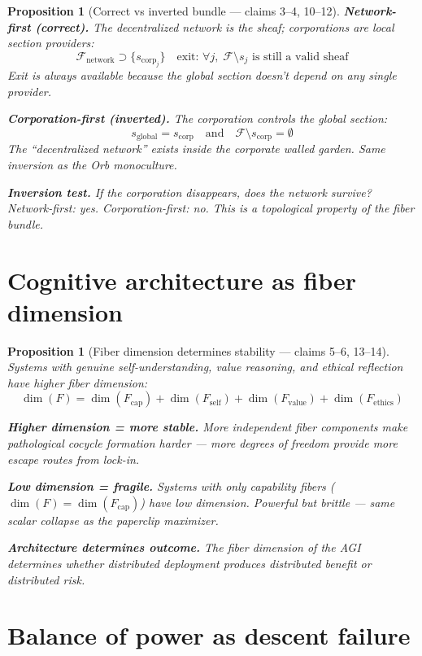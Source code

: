 \documentclass[11pt,a4paper]{article}
\newtheorem{proposition}[definition]{Proposition}
\begin{document}
\begin{proposition}[Correct vs inverted bundle --- claims 3--4, 10--12]
\label{prop:architecture}
\textbf{Network-first (correct).} The decentralized network is the
sheaf; corporations are local section providers:
\[
  \mathcal{F}_{\text{network}} \supset \{s_{\text{corp}_j}\}
  \quad \text{exit: } \forall j,\; \mathcal{F} \setminus s_j
    \text{ is still a valid sheaf}
\]
Exit is always available because the global section doesn't depend on any
single provider.

\textbf{Corporation-first (inverted).} The corporation controls the
global section:
\[
  s_{\text{global}} = s_{\text{corp}} \quad \text{and} \quad
    \mathcal{F} \setminus s_{\text{corp}} = \emptyset
\]
The ``decentralized network'' exists inside the corporate walled garden.
Same inversion as the Orb monoculture.

\textbf{Inversion test.} If the corporation disappears, does the network
survive? Network-first: yes. Corporation-first: no. This is a topological
property of the fiber bundle.
\end{proposition}

\section{Cognitive architecture as fiber dimension}

\begin{proposition}[Fiber dimension determines stability --- claims 5--6, 13--14]
\label{prop:fiber_dim}
Systems with genuine self-understanding, value reasoning, and ethical
reflection have higher fiber dimension:
\[
  \dim(F) = \dim(F_{\text{cap}}) + \dim(F_{\text{self}}) +
    \dim(F_{\text{value}}) + \dim(F_{\text{ethics}})
\]

\textbf{Higher dimension = more stable.} More independent fiber components
make pathological cocycle formation harder --- more degrees of freedom
provide more escape routes from lock-in.

\textbf{Low dimension = fragile.} Systems with only capability fibers
($\dim(F) = \dim(F_{\text{cap}})$) have low dimension. Powerful but
brittle --- same scalar collapse as the paperclip maximizer.

\textbf{Architecture determines outcome.} The fiber dimension of the AGI
determines whether distributed deployment produces distributed benefit or
distributed risk.
\end{proposition}

\section{Balance of power as descent failure}
\end{document}
